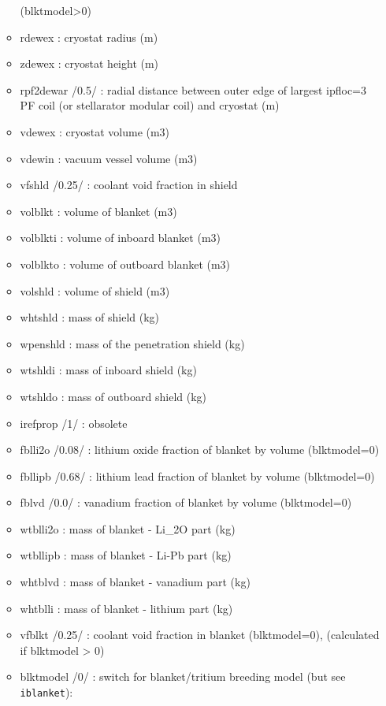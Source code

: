 \documentclass[]{article}
\begin{document}
\begin{itemize}
\begin{itemize}
    (blktmodel\textgreater{}0)
  \item
    rdewex : cryostat radius (m)
  \item
    zdewex : cryostat height (m)
  \item
    rpf2dewar /0.5/ : radial distance between outer edge of largest
    ipfloc=3 PF coil (or stellarator modular coil) and cryostat (m)
  \item
    vdewex : cryostat volume (m3)
  \item
    vdewin : vacuum vessel volume (m3)
  \item
    vfshld /0.25/ : coolant void fraction in shield
  \item
    volblkt : volume of blanket (m3)
  \item
    volblkti : volume of inboard blanket (m3)
  \item
    volblkto : volume of outboard blanket (m3)
  \item
    volshld : volume of shield (m3)
  \item
    whtshld : mass of shield (kg)
  \item
    wpenshld : mass of the penetration shield (kg)
  \item
    wtshldi : mass of inboard shield (kg)
  \item
    wtshldo : mass of outboard shield (kg)
  \item
    irefprop /1/ : obsolete
  \item
    fblli2o /0.08/ : lithium oxide fraction of blanket by volume
    (blktmodel=0)
  \item
    fbllipb /0.68/ : lithium lead fraction of blanket by volume
    (blktmodel=0)
  \item
    fblvd /0.0/ : vanadium fraction of blanket by volume (blktmodel=0)
  \item
    wtblli2o : mass of blanket - Li\_2O part (kg)
  \item
    wtbllipb : mass of blanket - Li-Pb part (kg)
  \item
    whtblvd : mass of blanket - vanadium part (kg)
  \item
    whtblli : mass of blanket - lithium part (kg)
  \item
    vfblkt /0.25/ : coolant void fraction in blanket (blktmodel=0),
    (calculated if blktmodel \textgreater{} 0)
  \item
    blktmodel /0/ : switch for blanket/tritium breeding model (but see
    \texttt{iblanket}):


\end{itemize}
\end{itemize}
\end{document}

